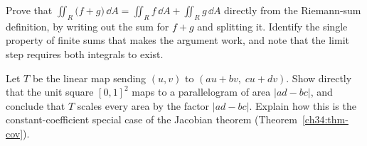 \begin{exercise}
Prove that $\iint_R\big(f+g\big)\,\dd A=\iint_R f\,\dd A+\iint_R g\,\dd A$
directly from the Riemann-sum definition, by writing out the sum for $f+g$ and
splitting it. Identify the single property of finite sums that makes the
argument work, and note that the limit step requires both integrals to exist.
\end{exercise}

\begin{exercise}
Let $T$ be the linear map sending $(u,v)$ to $(au+bv,\;cu+dv)$. Show directly that
the unit square $[0,1]^2$ maps to a parallelogram of area $|ad-bc|$, and conclude
that $T$ scales every area by the factor $|ad-bc|$. Explain how this is the
constant-coefficient special case of the Jacobian theorem
(Theorem~\ref{ch34:thm-cov}).
\end{exercise}
